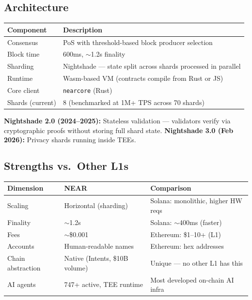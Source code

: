 \documentclass[11pt,a4paper]{article}
\begin{document}
\subsection{Architecture}

\begin{center}
\begin{tabular}{l p{8cm}}
\hline
\textbf{Component} & \textbf{Description} \\
\hline
Consensus & PoS with threshold-based block producer selection \\
Block time & 600ms, $\sim$1.2s finality \\
Sharding & Nightshade --- state split across shards processed in parallel \\
Runtime & Wasm-based VM (contracts compile from Rust or JS) \\
Core client & \texttt{nearcore} (Rust) \\
Shards (current) & 8 (benchmarked at 1M+ TPS across 70 shards) \\
\hline
\end{tabular}
\end{center}

\textbf{Nightshade 2.0 (2024--2025):} Stateless validation --- validators verify via cryptographic proofs without storing full shard state. \textbf{Nightshade 3.0 (Feb 2026):} Privacy shards running inside TEEs.

\subsection{Strengths vs.\ Other L1s}

\begin{center}
\begin{tabular}{l p{4cm} p{4cm}}
\hline
\textbf{Dimension} & \textbf{NEAR} & \textbf{Comparison} \\
\hline
Scaling & Horizontal (sharding) & Solana: monolithic, higher HW reqs \\
Finality & $\sim$1.2s & Solana: $\sim$400ms (faster) \\
Fees & $\sim$\$0.001 & Ethereum: \$1--10+ (L1) \\
Accounts & Human-readable names & Ethereum: hex addresses \\
Chain abstraction & Native (Intents, \$10B volume) & Unique --- no other L1 has this \\
AI agents & 747+ active, TEE runtime & Most developed on-chain AI infra \\
\hline
\end{tabular}
\end{center}
\end{document}
